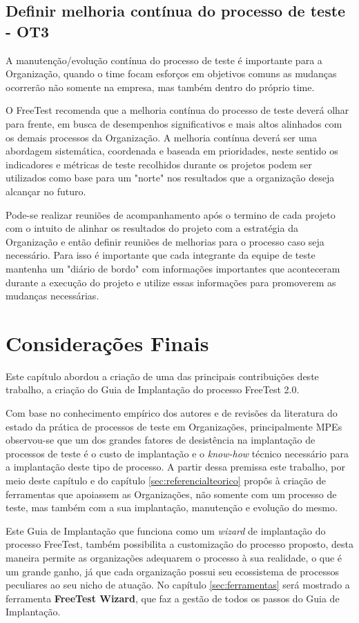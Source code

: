 \subsection{Definir melhoria contínua do processo de teste - OT3}

A manutenção/evolução contínua do processo de teste é importante para a Organização, quando o time focam esforços em objetivos comuns as mudanças ocorrerão não somente na empresa, mas também dentro do próprio time.

O FreeTest recomenda que a melhoria contínua do processo de teste deverá olhar para frente, em busca de desempenhos significativos e mais altos alinhados com os demais processos da Organização. A melhoria contínua deverá ser uma abordagem sistemática, coordenada e baseada em prioridades, neste sentido os indicadores e métricas de teste recolhidos durante os projetos podem ser utilizados como base para um "norte" nos resultados que a organização deseja alcançar no futuro.

Pode-se realizar reuniões de acompanhamento após o termino de cada projeto com o intuito de alinhar os resultados do projeto com a estratégia da Organização e então definir reuniões de melhorias para o processo caso seja necessário. Para isso é importante que cada integrante da equipe de teste mantenha um "diário de bordo" com informações importantes que aconteceram durante a execução do projeto e utilize essas informações para promoverem as mudanças necessárias.

\section{Considerações Finais}
\label{sec:consideracoesfinaisguiaimplantacao}

Este capítulo abordou a criação de uma das principais contribuições deste trabalho, a criação do Guia de Implantação do processo FreeTest 2.0. 

Com base no conhecimento empírico dos autores e de revisões da literatura do estado da prática de processos de teste em Organizações, principalmente MPEs observou-se que um dos grandes fatores de desistência na implantação de processos de teste é o custo de implantação e o \textit{know-how} técnico necessário para a implantação deste tipo de processo. A partir dessa premissa este trabalho, por meio deste capítulo e do capítulo \ref{sec:referencialteorico} propôs à criação de ferramentas que apoiassem as Organizações, não somente com um processo de teste, mas também com a sua implantação, manutenção e evolução do mesmo. 

Este Guia de Implantação que funciona como um \textit{wizard} de implantação do processo FreeTest, também possibilita a customização do processo proposto, desta maneira permite as organizações adequarem o processo à sua realidade, o que é um grande ganho, já que cada organização possui seu ecossistema de processos peculiares ao seu nicho de atuação. No capítulo \ref{sec:ferramentas} será mostrado a ferramenta \textbf{FreeTest Wizard}, que faz a gestão de todos os passos do Guia de Implantação.